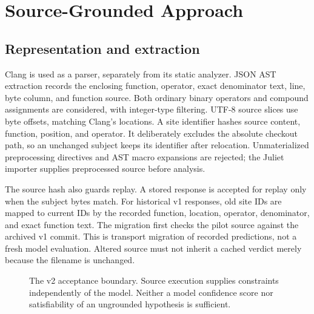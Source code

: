 \documentclass[sigconf]{acmart}
\begin{document}
\section{Source-Grounded Approach}
\subsection{Representation and extraction}
Clang is used as a parser, separately from its static analyzer. JSON AST
extraction records the enclosing function, operator, exact denominator text,
line, byte column, and function source. Both ordinary binary operators and
compound assignments are considered, with integer-type filtering. UTF-8 source
slices use byte offsets, matching Clang's locations. A site identifier hashes
source content, function, position, and operator. It deliberately excludes the
absolute checkout path, so an unchanged subject keeps its identifier after
relocation. Unmaterialized preprocessing directives and AST macro expansions
are rejected; the Juliet importer supplies preprocessed source before analysis.

The source hash also guards replay. A stored response is accepted for replay
only when the subject bytes match. For historical v1 responses, old site IDs are
mapped to current IDs by the recorded function, location, operator, denominator,
and exact function text. The migration first checks the pilot source against
the archived v1 commit. This is transport migration of recorded predictions,
not a fresh model evaluation. Altered source must not inherit a cached verdict
merely because the filename is unchanged.

\begin{figure}[t]
\centering
{}
\caption{The v2 acceptance boundary. Source execution supplies constraints
independently of the model. Neither a model confidence score nor satisfiability
of an ungrounded hypothesis is sufficient.}
\label{fig:architecture}
\end{figure}
\end{document}
